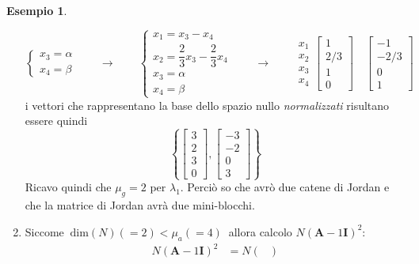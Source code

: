 \documentclass[a4paper]{article}
\renewcommand{\vec}{\bm}
\theoremstyle{definition}
\newtheorem{exmp}{Esempio}[section]
\begin{document}
\begin{exmp}
\begin{enumerate}
\[\begin{cases*}
							x_3 = \alpha \\
							x_4 = \beta
						\end{cases*}
						\qquad\longrightarrow\qquad
						\begin{cases*}
							x_1 = x_3 - x_4 \\
							x_2 = \dfrac{2}{3}x_3 - \dfrac{2}{3}x_4 \\
							x_3 = \alpha \\
							x_4 = \beta
						\end{cases*}
						\qquad\longrightarrow\qquad
						\begin{matrix}
							x_1 \\
							x_2 \\
							x_3 \\
							x_4
						\end{matrix}
						\begin{bmatrix}
							1 \\
							2/3 \\
							1 \\
							0
						\end{bmatrix}
						\quad
						\begin{bmatrix}
							-1 \\
							-2/3 \\
							0 \\
							1
						\end{bmatrix}
					\]
					i vettori che rappresentano la base dello spazio nullo \textit{normalizzati} risultano essere quindi
					\[
						\left\{
						\begin{bmatrix}
							3 \\
							2 \\
							3 \\
							0
						\end{bmatrix},
						\begin{bmatrix}
							-3 \\
							-2 \\
							0 \\
							3
						\end{bmatrix}
						\right\}
					\]
					Ricavo quindi che $ \mu_g = 2 $ per $ \lambda_1 $. Perciò so che avrò due catene di Jordan e che la matrice di Jordan avrà due mini-blocchi.
					\item Siccome $\ \text{dim}(N) (= 2) < \mu_a (= 4)\ $ allora calcolo $ N(\vec{A} - 1\vec{I})^2 $:
					\begin{align*}
						N(\vec{A} - 1\vec{I})^2 &= N
						\begin{pmatrix}

\end{pmatrix}
\end{align*}
\end{enumerate}
\end{exmp}
\end{document}
